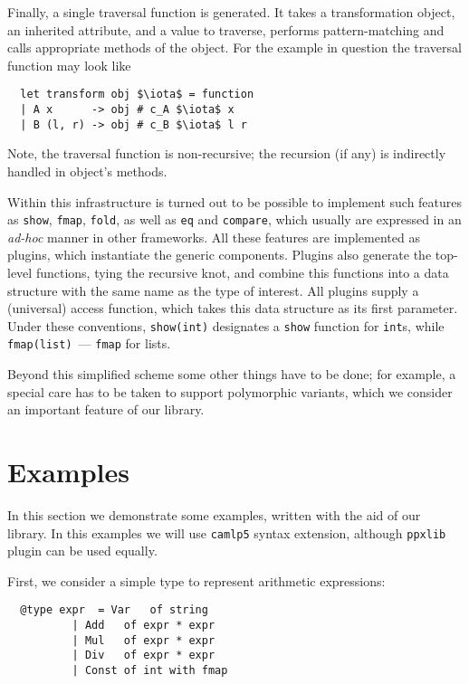 \documentclass[submission,copyright,creativecommons]{eptcs}
\newcommand{\cd}[1]{\texttt{#1}}
\begin{document}
Finally, a single traversal function is generated. It takes a transformation object, an inherited attribute, and a value to traverse, performs pattern-matching
and calls appropriate methods of the object. For the example in question the traversal function may look like

\begin{lstlisting}
  let transform obj $\iota$ = function
  | A x      -> obj # c_A $\iota$ x
  | B (l, r) -> obj # c_B $\iota$ l r
\end{lstlisting}

Note, the traversal function is non-recursive; the recursion (if any) is indirectly handled in object's methods.

Within this infrastructure is turned out to be possible to implement such features as \cd{show}, \cd{fmap}, \cd{fold},
as well as \cd{eq} and \cd{compare}, which usually are expressed in an \emph{ad-hoc} manner in other frameworks. All these features are
implemented as plugins, which instantiate the generic components. Plugins also generate the top-level functions, tying the recursive knot,
and combine this functions into a data structure with the same name as the type of interest. All plugins supply a (universal) access function,
which takes this data structure as its first parameter. Under these conventions, \cd{show(int)} designates a \cd{show} function for \cd{int}s,
while \cd{fmap(list)}~--- \cd{fmap} for lists.

Beyond this simplified scheme some other things have to be done; for example, a special care has to be taken to support polymorphic variants, which
we consider an important feature of our library.

\section{Examples}

In this section we demonstrate some examples, written with the aid of our library. In this examples we will use \cd{camlp5} syntax extension,
although \cd{ppxlib} plugin can be used equally.

First, we consider a simple type to represent arithmetic expressions:

\begin{lstlisting}
  @type expr  = Var   of string
	      | Add   of expr * expr
	      | Mul   of expr * expr
	      | Div   of expr * expr
	      | Const of int with fmap
\end{lstlisting}
\end{document}
